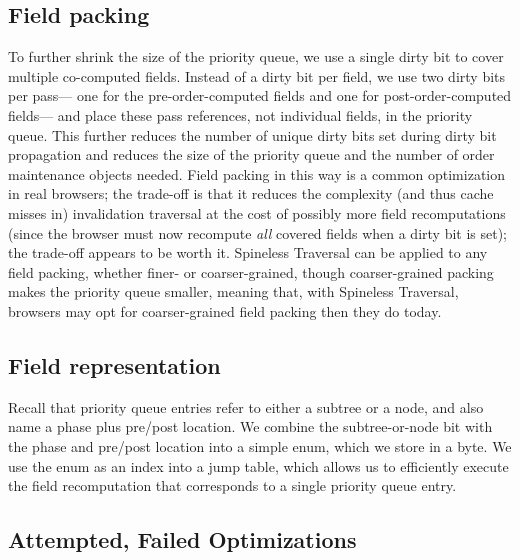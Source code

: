 \subsection{Field packing}

To further shrink the size of the priority queue,
  we use a single dirty bit to cover multiple co-computed fields.
Instead of a dirty bit per field,
  we use two dirty bits per pass---%
  one for the pre-order-computed fields
  and one for post-order-computed fields---%
  and place these pass references,
  not individual fields, in the priority queue.
This further reduces the number of unique dirty bits
  set during dirty bit propagation
  and reduces the size of the priority queue
  and the number of order maintenance objects needed.
Field packing in this way is a common optimization in real browsers;
  the trade-off is that it reduces the complexity
  (and thus cache misses in) invalidation traversal
  at the cost of possibly more field recomputations
  (since the browser must now recompute \emph{all} covered fields
  when a dirty bit is set);
  the trade-off appears to be worth it.
Spineless Traversal can be applied to any field packing,
  whether finer- or coarser-grained,
  though coarser-grained packing makes
  the priority queue smaller,
  meaning that, with Spineless Traversal,
  browsers may opt for coarser-grained field packing
  then they do today.

\subsection{Field representation}

Recall that priority queue entries
  refer to either a subtree or a node,
  and also name a phase plus pre/post location.
We combine the subtree-or-node bit with the phase and pre/post location
  into a simple enum, which we store in a byte.
We use the enum as an index into a jump table,
  which allows us to efficiently execute the field recomputation
  that corresponds to a single priority queue entry.

\subsection{Attempted, Failed Optimizations}


